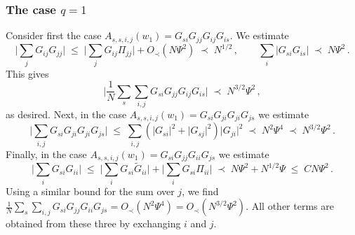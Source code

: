 \documentclass[11pt]{article} %
\numberwithin{equation}{section}
\numberwithin{figure}{section}
\theoremstyle{plain} %
\theoremstyle{definition} %
\newcommand{\wt}{\widetilde}
\renewcommand{\leq}{\leqslant}
\newcommand{\abs}[1]{\lvert #1 \rvert}
\newcommand{\absbb}[1]{\biggl\lvert #1 \biggr\rvert}
\begin{document}
\subsubsection*{The case $q = 1$}
Consider first the case $A_{s,s,i,j }(w_1) = G_{si}  G_{jj}G_{ij}G_{is}$. We estimate
\begin{equation*}
\absbb{\sum_{j} G_{ij}G_{jj}} \;\leq\;  \absbb{\sum_{j} G_{ij}\Pi_{jj}}+O_\prec (N\Psi^2) \;\prec\; N^{1/2}
\,, \qquad \sum_i \abs{G_{si}G_{is}} \;\prec\; N \Psi^2\,.
\end{equation*}
This gives
 $$
\absbb{\frac{1}{N}\sum_s\sum_{i, j}G_{si}  G_{jj}G_{ij}G_{is}} \;\prec\; N^{3/2}\Psi^2\,,
 $$
 as desired. Next, in the case $A_{s,s,i,j }(w_1) = G_{si} G_{ji} G_{ji}G_{js}$ we estimate
 $$
\absbb{\sum_{i, j}G_{si} G_{ji} G_{ji}G_{js}} \;\leq\; \sum_{i, j}(\abs{G_{si}}^2+\abs{G_{sj}}^2) \abs{G_{ji}}^2 \;\prec\; N^2\Psi^4 \;\prec\; N^{3/2}\Psi^2\,.
 $$
 Finally, in the case $A_{s,s,i,j }(w_1) = G_{si} G_{jj} G_{ii} G_{js}$ we estimate
\begin{equation*}
\absbb{\sum_i G_{si} G_{ii}} \;\leq\; \absbb{\sum_i G_{si} \wt G_{ii}} + \absbb{\sum_i G_{si} \Pi_{ii}} \;\prec\; N \Psi^2 + N^{1/2} \Psi \;\leq\; C N \Psi^2\,.
\end{equation*}
Using a similar bound for the sum over $j$, we find $\frac{1}{N} \sum_s \sum_{i,j} G_{si} G_{jj} G_{ii} G_{js} = O_\prec(N^2 \Psi^4) = O_\prec(N^{3/2} \Psi^2)$. All other terms are obtained from these three by exchanging $i$ and $j$.
\end{document}
